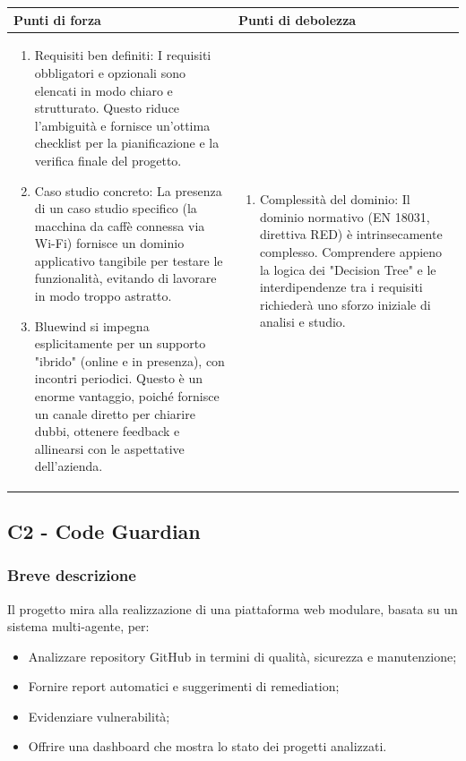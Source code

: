 \documentclass[a4paper,11pt]{article}
\begin{document}
{\footnotesize
\begin{tabularx}{\textwidth}{|X|X|}
\hline
\rowcolor{lightgray!40} %
\textbf{Punti di forza} & \textbf{Punti di debolezza} \\
\hline
\begin{enumerate}
\item Requisiti ben definiti: I requisiti obbligatori e opzionali sono elencati in modo chiaro e strutturato. Questo riduce l'ambiguità e fornisce un'ottima checklist per la pianificazione e la verifica finale del progetto.
\item Caso studio concreto: La presenza di un caso studio specifico (la macchina da caffè connessa via Wi-Fi) fornisce un dominio applicativo tangibile per testare le funzionalità, evitando di lavorare in modo troppo astratto.

\item Bluewind si impegna esplicitamente per un supporto "ibrido" (online e in presenza), con incontri periodici. Questo è un enorme vantaggio, poiché fornisce un canale diretto per chiarire dubbi, ottenere feedback e allinearsi con le aspettative dell'azienda.

\end{enumerate}
 & \begin{enumerate}
\item Complessità del dominio: Il dominio normativo (EN 18031, direttiva RED) è intrinsecamente complesso. Comprendere appieno la logica dei "Decision Tree" e le interdipendenze tra i requisiti richiederà uno sforzo iniziale di analisi e studio.
\end{enumerate} \\
\hline
\end{tabularx}
}

\subsection{C2 - Code Guardian}
\subsubsection{Breve descrizione}
Il progetto mira alla realizzazione di una piattaforma web modulare, basata su un sistema multi-agente, per:

\begin{itemize}[leftmargin=*]
  \item Analizzare repository GitHub in termini di qualità, sicurezza e manutenzione;
  \item Fornire report automatici e suggerimenti di remediation;
  \item Evidenziare vulnerabilità;
  \item Offrire una dashboard che mostra lo stato dei progetti analizzati.
\end{itemize}
\end{document}
